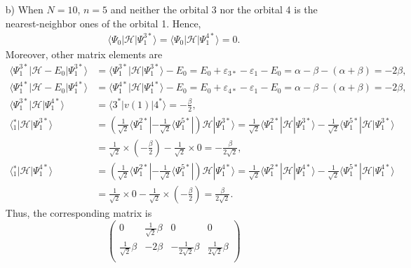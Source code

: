 \documentclass[a4paper]{book}
\newcounter{solution}[chapter]
\begin{document}
\begin{solution}
\begin{itemize}
	\item[b)] When $N=10$, $n=5$ and neither the orbital 3 nor the orbital 4 is the nearest-neighbor ones of the orbital 1. Hence,
	\begin{align*}
		\langle \Psi_0 | \mathscr{H} | \Psi^{3*}_1 \rangle = \langle \Psi_0 | \mathscr{H} | \Psi^{4*}_1 \rangle = 0.
	\end{align*}
	Moreover, other matrix elements are
	\begin{align*}
		\langle \Psi^{3*}_1 | \mathscr{H} - E_0 | \Psi^{3*}_1 \rangle &= \langle \Psi^{3*}_1 | \mathscr{H} | \Psi^{3*}_1 \rangle - E_0 = E_0 + \varepsilon_{3*} - \varepsilon_1 - E_0 = \alpha - \beta - ( \alpha + \beta ) = - 2 \beta , \\
		\langle \Psi^{4*}_1 | \mathscr{H} - E_0 | \Psi^{4*}_1 \rangle &= \langle \Psi^{4*}_1 | \mathscr{H} | \Psi^{4*}_1 \rangle - E_0 = E_0 + \varepsilon_{4*} - \varepsilon_1 - E_0 = \alpha - \beta - ( \alpha + \beta ) = - 2 \beta , \\
		\langle \Psi^{3*}_1 | \mathscr{H} | \Psi^{4*}_1 \rangle &= \langle 3^* | v(1) | 4^* \rangle = - \frac{ \beta }{2} , \\
		\langle {}^*_1 | \mathscr{H} | \Psi^{3*}_1 \rangle &= \left( \frac{1}{ \sqrt{2} } \langle \Psi^{2*}_1 | - \frac{1}{ \sqrt{2} } \langle \Psi^{5*}_1 | \right) \mathscr{H} | \Psi^{3*}_1 \rangle = \frac{1}{ \sqrt{2} } \langle \Psi^{2*}_1 | \mathscr{H} | \Psi^{3*}_1 \rangle - \frac{1}{ \sqrt{2} } \langle \Psi^{5*}_1 | \mathscr{H} | \Psi^{3*}_1 \rangle \\
		&= \frac{1}{ \sqrt{2} } \times ( -\frac{ \beta }{2} ) - \frac{1}{ \sqrt{2} } \times 0 = - \frac{ \beta }{ 2\sqrt{2} } ,\\
		\langle {}^*_1 | \mathscr{H} | \Psi^{4*}_1 \rangle &= \left( \frac{1}{ \sqrt{2} } \langle \Psi^{2*}_1 | - \frac{1}{ \sqrt{2} } \langle \Psi^{5*}_1 | \right) \mathscr{H} | \Psi^{4*}_1 \rangle = \frac{1}{ \sqrt{2} } \langle \Psi^{2*}_1 | \mathscr{H} | \Psi^{4*}_1 \rangle - \frac{1}{ \sqrt{2} } \langle \Psi^{5*}_1 | \mathscr{H} | \Psi^{4*}_1 \rangle \\
		&= \frac{1}{ \sqrt{2} } \times 0  - \frac{1}{ \sqrt{2} } \times ( -\frac{ \beta }{2} ) = \frac{ \beta }{ 2\sqrt{2} } .
	\end{align*}
	Thus, the corresponding matrix is
	\[
		\begin{pmatrix}
			0 & \frac{1}{\sqrt{2}} \beta & 0 & 0 \\
		\frac{1}{\sqrt{2}} \beta & -2\beta & -\frac{1}{2\sqrt{2}} \beta & \frac{1}{2\sqrt{2}} \beta \\

\end{pmatrix}\]
\end{itemize}
\end{solution}
\end{document}
